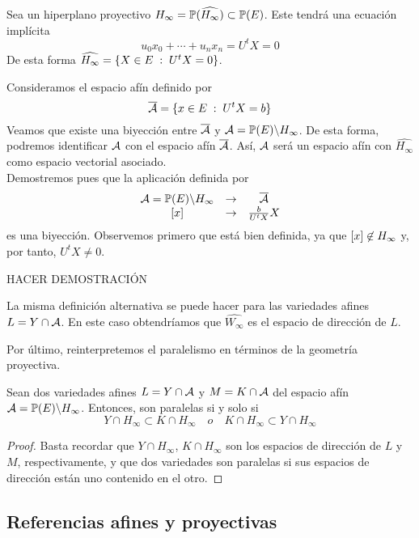 Sea un hiperplano proyectivo $H_\infty=\mathbb{P}(\widehat{H_\infty})\subset\mathbb{P}(E)$. Este tendrá una ecuación implícita
\begin{equation*}
	u_0x_0+\cdots +u_nx_n=U^tX=0
\end{equation*}
De esta forma $\widehat{H_\infty}=\{X\in E\;:\; U^tX=0\}$.

Consideramos el espacio afín definido por
\begin{equation*}
 \overline{\mathcal{A}}=\{x\in E\;:\; U^tX=b\}
\end{equation*}
Veamos que existe una biyección entre $\overline{\mathcal{A}}$ y $\mathcal{A}=\mathbb{P}(E)\backslash H_\infty$. De esta forma, podremos identificar $\mathcal{A}$ con el espacio afín $\overline{\mathcal{A}}$. Así, $\mathcal{A}$ será un espacio afín con $\widehat{H_\infty}$ como espacio vectorial asociado.\\

Demostremos pues que la aplicación definida por
\begin{equation*}
	\begin{array}{ccc}
		\mathcal{A}=\mathbb{P}(E)\backslash H_\infty & \rightarrow & \overline{\mathcal{A}}\\
		\left [ x \right ] & \rightarrow & \frac{b}{U^t X}X
	\end{array}
\end{equation*}
es una biyección. Observemos primero que está bien definida, ya que $\left [ x \right ]\not\in H_\infty$ y, por tanto, $U^t X\not =0$.

HACER DEMOSTRACIÓN

La misma definición alternativa se puede hacer para las variedades afines $L=Y\cap\mathcal{A}$. En este caso obtendríamos que $\widehat{W_\infty}$ es el espacio de dirección de $L$.

Por último, reinterpretemos el paralelismo en términos de la geometría proyectiva.

\begin{lem}
	Sean dos variedades afines $L=Y\cap\mathcal{A}$ y $M=K\cap\mathcal{A}$ del espacio afín $\mathcal{A}=\mathbb{P}(E)\backslash H_\infty$. Entonces, son paralelas si y solo si
	\begin{equation}
		Y\cap H_\infty\subset K\cap H_\infty \quad o \quad 	K\cap H_\infty\subset Y\cap H_\infty
	\end{equation}
\end{lem}
\begin{proof}
	Basta recordar que $Y\cap H_\infty$, $K\cap H_\infty$ son los espacios de dirección de $L$ y $M$, respectivamente, y que dos variedades son paralelas si sus espacios de dirección están uno contenido en el otro.
\end{proof}

\subsection{Referencias afines y proyectivas}


